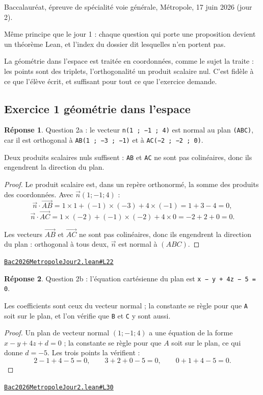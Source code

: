 \documentclass[11pt,a4paper]{article}
\theoremstyle{definition}
\theoremstyle{plain}
\theoremstyle{definition}
\newtheorem*{reponse}{Réponse}
\newcommand{\source}[2]{\par\smallskip\noindent\hfill{\footnotesize\href{#1}{\texttt{#2}}}\par\smallskip}
\begin{document}
\noindent
Baccalauréat, épreuve de spécialité \textemdash{} voie générale, Métropole, 17 juin 2026 (jour 2).

Même principe que le jour 1 : chaque question qui porte une proposition devient un
théorème Lean, et l'index du dossier dit lesquelles n'en portent pas.

La géométrie dans l'espace est traitée en coordonnées, comme le sujet la traite : les
points sont des triplets, l'orthogonalité un produit scalaire nul. C'est fidèle à ce
que l'élève écrit, et suffisant pour tout ce que l'exercice demande.

\subsection{Exercice 1 \textemdash{} géométrie dans l'espace}

\begin{reponse}
Question 2a : le vecteur \texttt{n(1 ; −1 ; 4)} est normal au plan \texttt{(ABC)}, car il est
orthogonal à \texttt{AB(1 ; −3 ; −1)} et à \texttt{AC(−2 ; −2 ; 0)}.

Deux produits scalaires nuls suffisent : \texttt{AB} et \texttt{AC} ne sont pas colinéaires, donc ils
engendrent la direction du plan.
\end{reponse}
\begin{proof}
Le produit scalaire est, dans un repère orthonormé, la somme des produits des coordonnées.
Avec $\vec{n}(1 ; -1 ; 4)$ :
\[ \vec{n} \cdot \vec{AB} = 1 \times 1 + (-1) \times (-3) + 4 \times (-1) = 1 + 3 - 4 = 0 , \]
\[ \vec{n} \cdot \vec{AC} = 1 \times (-2) + (-1) \times (-2) + 4 \times 0 = -2 + 2 + 0 = 0 . \]

Les vecteurs $\vec{AB}$ et $\vec{AC}$ ne sont pas colinéaires, donc ils engendrent la
direction du plan : orthogonal à tous deux, $\vec{n}$ est normal à $(ABC)$.
\end{proof}
\source{https://github.com/Commutator-IO/learn-lean/blob/main/exams/2026/Bac2026MetropoleJour2.lean\#L22}{Bac2026MetropoleJour2.lean\#L22}

\begin{reponse}
Question 2b : l'équation cartésienne du plan est \texttt{x − y + 4z − 5 = 0}.

Les coefficients sont ceux du vecteur normal ; la constante se règle pour que \texttt{A} soit
sur le plan, et l'on vérifie que \texttt{B} et \texttt{C} y sont aussi.
\end{reponse}
\begin{proof}
Un plan de vecteur normal $(1 ; -1 ; 4)$ a une équation de la forme $x - y + 4z + d = 0$ ;
la constante se règle pour que $A$ soit sur le plan, ce qui donne $d = -5$. Les trois
points la vérifient :
\[ 2 - 1 + 4 - 5 = 0 , \qquad 3 + 2 + 0 - 5 = 0 , \qquad 0 + 1 + 4 - 5 = 0 . \]
\end{proof}
\source{https://github.com/Commutator-IO/learn-lean/blob/main/exams/2026/Bac2026MetropoleJour2.lean\#L30}{Bac2026MetropoleJour2.lean\#L30}
\end{document}
